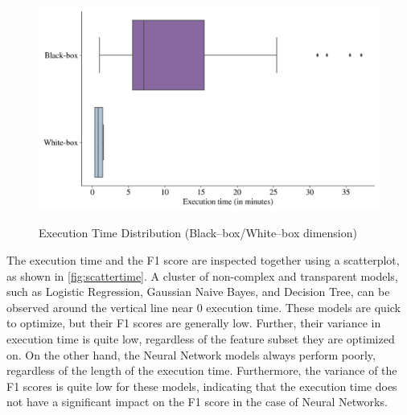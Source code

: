 \begin{figure}[H]
    \centering
    \caption{Execution Time Distribution (Black--box/White--box dimension)}\vspace{0.5em}
    \label{fig:timedistbbwb}\
    \includegraphics[width=140mm]{Figures/EXECUTION_TIME_Distribution_BB_WB.jpg}

    \vspace{-1em}
\end{figure}


The execution time and the F1 score are inspected together using a scatterplot, as shown in \autoref{fig:scattertime}. 
A cluster of non-complex and transparent models, such as Logistic Regression, Gaussian Naive Bayes, and Decision Tree, can be observed around the vertical line near 0 execution time. These models are quick to optimize, but their F1 scores are generally low.
Further, their variance in execution time is quite low, regardless of the feature subset they are optimized on.
On the other hand, the Neural Network models always perform poorly, regardless of the length of the execution time. Furthermore, the variance of the F1 scores is quite low for these models, indicating that the execution time does not have a significant impact on the F1 score in the case of Neural Networks.

